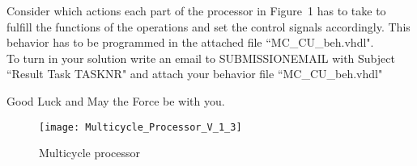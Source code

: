 \documentclass[a4paper,12pt]{article}
\begin{document}
Consider which actions each part of the processor in Figure~1 has to take to fulfill the functions of the operations and set the control signals accordingly. This behavior has to be programmed in the attached file ``MC\_CU\_beh.vhdl".\\


To turn in your solution write an email to {{SUBMISSIONEMAIL}} with Subject ``Result Task {{TASKNR}}" and attach your behavior file ``MC\_CU\_beh.vhdl"


\vspace{0.7cm}
Good Luck and May the Force be with you.

\begin{landscape}
\begin{figure}[!h]
\vspace{-1cm}
\hspace{-1.8cm}
\texttt{[image: Multicycle\_Processor\_V\_1\_3]}
\caption{Multicycle processor}
\label{fig:MulticycleProcessor}
\end{figure}
\end{landscape}
\end{document}
